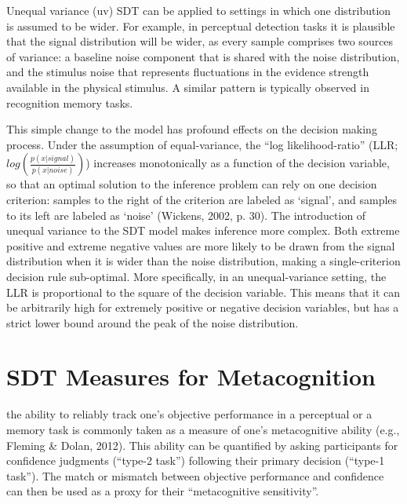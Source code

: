 \documentclass[12pt,twoside]{reedthesis}
\begin{document}
Unequal variance (uv) SDT can be applied to settings in which one distribution is assumed to be wider. For example, in perceptual detection tasks it is plausible that the signal distribution will be wider, as every sample comprises two sources of variance: a baseline noise component that is shared with the noise distribution, and the stimulus noise that represents fluctuations in the evidence strength available in the physical stimulus. A similar pattern is typically observed in recognition memory tasks.

This simple change to the model has profound effects on the decision making process. Under the assumption of equal-variance, the ``log likelihood-ratio'' (LLR; \(log(\frac{p(x|signal)}{p(x|noise)})\)) increases monotonically as a function of the decision variable, so that an optimal solution to the inference problem can rely on one decision criterion: samples to the right of the criterion are labeled as `signal', and samples to its left are labeled as `noise' (Wickens, 2002, p. 30). The introduction of unequal variance to the SDT model makes inference more complex. Both extreme positive and extreme negative values are more likely to be drawn from the signal distribution when it is wider than the noise distribution, making a single-criterion decision rule sub-optimal. More specifically, in an unequal-variance setting, the LLR is proportional to the square of the decision variable. This means that it can be arbitrarily high for extremely positive or negative decision variables, but has a strict lower bound around the peak of the noise distribution.

\hypertarget{app1:mc}{%
\section{SDT Measures for Metacognition}\label{app1:mc}}

the ability to reliably track one's objective performance in a perceptual or a memory task is commonly taken as a measure of one's metacognitive ability (e.g., Fleming \& Dolan, 2012). This ability can be quantified by asking participants for confidence judgments (``type-2 task'') following their primary decision (``type-1 task''). The match or mismatch between objective performance and confidence can then be used as a proxy for their ``metacognitive sensitivity''.
\end{document}
